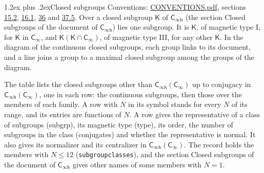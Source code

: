 \documentclass[10pt,a4paper]{article}
\makeatletter
\renewcommand\section{\@startsection{section}{1}{\z@}{-3ex plus -1ex minus -.2ex}%
  {1.2ex plus .2ex}{\normalfont\large\sffamily\bfseries\color{parttitle}}}
\numberwithin{equation}{section}
\newcommand{\grp}[1]{\mathsf{#1}}
\makeatother
\begin{document}
\section{Closed subgroups}\label{s:subgroups}
Conventions: \href{../../CONVENTIONS.pdf}{CONVENTIONS.pdf}, sections \href{../../../rotation/CONVENTIONS.pdf\#conv.15.2}{15.2}, \href{../../../rotation/CONVENTIONS.pdf\#conv.16.1}{16.1}, \href{../../CONVENTIONS.pdf\#conv.36}{36} and \href{../../CONVENTIONS.pdf\#conv.37.5}{37.5}.
\leavevmode\label{n:group.subgroup.point}Over a closed subgroup $\grp{K}$ of $\grp{C_{\infty h}}$ (the section Closed subgroups of the document of \href{../../../rotation/data/pdf/Cinfh.pdf}{$\grp{C_{\infty h}}$}) lies one subgroup. It is $\grp{K}$, of magnetic type I, for $\grp{K}$ in $\grp{C_{\infty}}$, and $\grp{K}(\grp{K} \cap \grp{C_{\infty}})$, of magnetic type III, for any other $\grp{K}$. In the diagram of the continuous closed subgroups, each group links to its document, and a line joins a group to a maximal closed subgroup among the groups of the diagram.
\begin{center}\end{center}
The table lists the closed subgroups other than $\grp{C_{\infty h}}(\grp{C_{\infty}})$ up to conjugacy in $\grp{C_{\infty h}}(\grp{C_{\infty}})$, one in each row: the continuous subgroups, then those over the members of each family. \label{n:index.family.N}A row with $N$ in its symbol stands for every $N$ of its range, and its entries are functions of $N$. \label{n:head.subgroup}\label{n:head.magnetic.type}\label{n:head.order}\label{n:head.conjugates}\label{n:head.normal}A row gives the representative of a class of subgroups (subgrp), its magnetic type (type), its order, the number of subgroups in the class (conjugates) and whether the representative is normal. \label{n:head.normalizer}\label{n:head.centralizer}It also gives its normalizer and its centralizer in $\grp{C_{\infty h}}(\grp{C_{\infty}})$. The record holds the members with $N \le 12$ (\texttt{subgroupclasses}), and the section Closed subgroups of the document of \href{../../../rotation/data/pdf/Cinfh.pdf}{$\grp{C_{\infty h}}$} gives other names of some members with $N = 1$.
\end{document}
